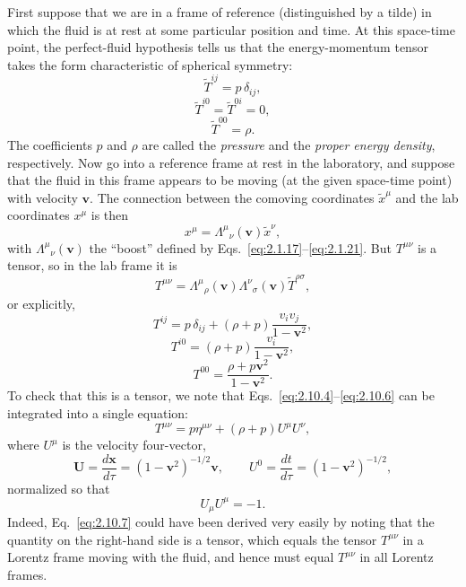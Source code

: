 First suppose that we are in a frame of reference (distinguished by a tilde) in
which the fluid is at rest at some particular position and time. At this
space-time point, the perfect-fluid hypothesis tells us that the energy-momentum
tensor takes the form characteristic of spherical symmetry:
\begin{equation}
  \widetilde T^{ij}=p\,\delta_{ij},
  \tag{2.10.1}\label{eq:2.10.1}
\end{equation}
\begin{equation}
  \widetilde T^{i0}=\widetilde T^{0i}=0,
  \tag{2.10.2}\label{eq:2.10.2}
\end{equation}
\begin{equation}
  \widetilde T^{00}=\rho.
  \tag{2.10.3}\label{eq:2.10.3}
\end{equation}
The coefficients \(p\) and \(\rho\) are called the \emph{pressure} and the
\emph{proper energy density}, respectively. Now go into a reference frame at
rest in the laboratory, and suppose that the fluid in this frame appears to be
moving (at the given space-time point) with velocity \(\mathbf v\). The
connection between the comoving coordinates \(\widetilde x^\mu\) and the lab
coordinates \(x^\mu\) is then
\[
  x^\mu=\Lambda^\mu{}_\nu(\mathbf v)\widetilde x^\nu ,
\]
with \(\Lambda^\mu{}_\nu(\mathbf v)\) the ``boost'' defined by
Eqs.~\eqref{eq:2.1.17}--\eqref{eq:2.1.21}. But \(T^{\mu\nu}\) is a tensor,
so in the lab frame it is
\[
  T^{\mu\nu}
  =\Lambda^\mu{}_\rho(\mathbf v)\Lambda^\nu{}_\sigma(\mathbf v)
   \widetilde T^{\rho\sigma},
\]
or explicitly,
\begin{equation}
  T^{ij}=p\,\delta_{ij}
  +(\rho+p)\frac{v_iv_j}{1-\mathbf v^2},
  \tag{2.10.4}\label{eq:2.10.4}
\end{equation}
\begin{equation}
  T^{i0}=(\rho+p)\frac{v_i}{1-\mathbf v^2},
  \tag{2.10.5}\label{eq:2.10.5}
\end{equation}
\begin{equation}
  T^{00}=\frac{\rho+p\mathbf v^2}{1-\mathbf v^2}.
  \tag{2.10.6}\label{eq:2.10.6}
\end{equation}
To check that this is a tensor, we note that
Eqs.~\eqref{eq:2.10.4}--\eqref{eq:2.10.6} can be integrated into a single
equation:
\begin{equation}
  T^{\mu\nu}=p\eta^{\mu\nu}+(\rho+p)U^\mu U^\nu ,
  \tag{2.10.7}\label{eq:2.10.7}
\end{equation}
where \(U^\mu\) is the velocity four-vector,
\begin{equation}
  \mathbf U=\frac{d\mathbf x}{d\tau}
  =(1-\mathbf v^2)^{-1/2}\mathbf v,\qquad
  U^0=\frac{dt}{d\tau}=(1-\mathbf v^2)^{-1/2},
  \tag{2.10.8}\label{eq:2.10.8}
\end{equation}
normalized so that
\begin{equation}
  U_\mu U^\mu=-1.
  \tag{2.10.9}\label{eq:2.10.9}
\end{equation}
Indeed, Eq.~\eqref{eq:2.10.7} could have been derived very easily by noting
that the quantity on the right-hand side is a tensor, which equals the tensor
\(T^{\mu\nu}\) in a Lorentz frame moving with the fluid, and hence must equal
\(T^{\mu\nu}\) in all Lorentz frames.

